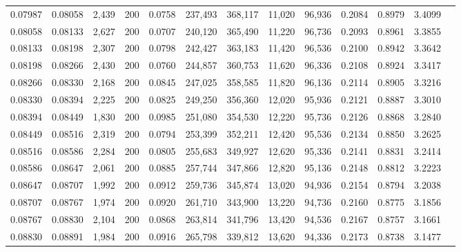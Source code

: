 \begin{tabular}{rrrrrrrrrrrrr}
0.07987 & 0.08058 &  2,439 & 200 &                                     0.0758 & 237,493 & 368,117 &  11,020 &  96,936 & 0.2084 & 0.8979 & 3.4099 \\
0.08058 & 0.08133 &  2,627 & 200 &                                     0.0707 & 240,120 & 365,490 &  11,220 &  96,736 & 0.2093 & 0.8961 & 3.3855 \\
0.08133 & 0.08198 &  2,307 & 200 &                                     0.0798 & 242,427 & 363,183 &  11,420 &  96,536 & 0.2100 & 0.8942 & 3.3642 \\
0.08198 & 0.08266 &  2,430 & 200 &                                     0.0760 & 244,857 & 360,753 &  11,620 &  96,336 & 0.2108 & 0.8924 & 3.3417 \\
0.08266 & 0.08330 &  2,168 & 200 &                                     0.0845 & 247,025 & 358,585 &  11,820 &  96,136 & 0.2114 & 0.8905 & 3.3216 \\
0.08330 & 0.08394 &  2,225 & 200 &                                     0.0825 & 249,250 & 356,360 &  12,020 &  95,936 & 0.2121 & 0.8887 & 3.3010 \\
0.08394 & 0.08449 &  1,830 & 200 &                                     0.0985 & 251,080 & 354,530 &  12,220 &  95,736 & 0.2126 & 0.8868 & 3.2840 \\
0.08449 & 0.08516 &  2,319 & 200 &                                     0.0794 & 253,399 & 352,211 &  12,420 &  95,536 & 0.2134 & 0.8850 & 3.2625 \\
0.08516 & 0.08586 &  2,284 & 200 &                                     0.0805 & 255,683 & 349,927 &  12,620 &  95,336 & 0.2141 & 0.8831 & 3.2414 \\
0.08586 & 0.08647 &  2,061 & 200 &                                     0.0885 & 257,744 & 347,866 &  12,820 &  95,136 & 0.2148 & 0.8812 & 3.2223 \\
0.08647 & 0.08707 &  1,992 & 200 &                                     0.0912 & 259,736 & 345,874 &  13,020 &  94,936 & 0.2154 & 0.8794 & 3.2038 \\
0.08707 & 0.08767 &  1,974 & 200 &                                     0.0920 & 261,710 & 343,900 &  13,220 &  94,736 & 0.2160 & 0.8775 & 3.1856 \\
0.08767 & 0.08830 &  2,104 & 200 &                                     0.0868 & 263,814 & 341,796 &  13,420 &  94,536 & 0.2167 & 0.8757 & 3.1661 \\
0.08830 & 0.08891 &  1,984 & 200 &                                     0.0916 & 265,798 & 339,812 &  13,620 &  94,336 & 0.2173 & 0.8738 & 3.1477 \\

\end{tabular}

